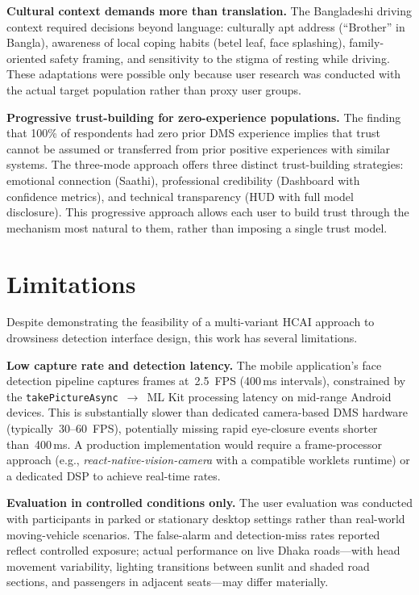 \documentclass[sigconf]{acmart}
\begin{document}
\textbf{Cultural context demands more than translation.} The Bangladeshi driving context required decisions beyond language: culturally apt address (``Brother'' in Bangla), awareness of local coping habits (betel leaf, face splashing), family-oriented safety framing, and sensitivity to the stigma of resting while driving. These adaptations were possible only because user research was conducted with the actual target population rather than proxy user groups.

\textbf{Progressive trust-building for zero-experience populations.} The finding that 100\% of respondents had zero prior DMS experience implies that trust cannot be assumed or transferred from prior positive experiences with similar systems. The three-mode approach offers three distinct trust-building strategies: emotional connection (Saathi), professional credibility (Dashboard with confidence metrics), and technical transparency (HUD with full model disclosure). This progressive approach allows each user to build trust through the mechanism most natural to them, rather than imposing a single trust model.


\section{Limitations}

Despite demonstrating the feasibility of a multi-variant HCAI approach to drowsiness detection interface design, this work has several limitations.

\textbf{Low capture rate and detection latency.} The mobile application's face detection pipeline captures frames at~2.5~FPS (400\,ms intervals), constrained by the \texttt{takePictureAsync}~$\to$~ML Kit processing latency on mid-range Android devices. This is substantially slower than dedicated camera-based DMS hardware (typically~30--60~FPS), potentially missing rapid eye-closure events shorter than~400\,ms. A production implementation would require a frame-processor approach (e.g., \textit{react-native-vision-camera} with a compatible worklets runtime) or a dedicated DSP to achieve real-time rates.

\textbf{Evaluation in controlled conditions only.} The user evaluation was conducted with participants in parked or stationary desktop settings rather than real-world moving-vehicle scenarios. The false-alarm and detection-miss rates reported reflect controlled exposure; actual performance on live Dhaka roads---with head movement variability, lighting transitions between sunlit and shaded road sections, and passengers in adjacent seats---may differ materially.
\end{document}

